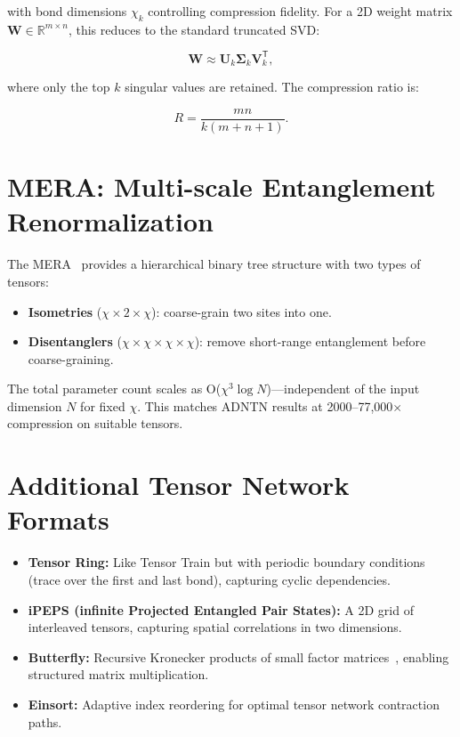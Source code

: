 \documentclass[11pt,a4paper,openright]{book}
\begin{document}
with bond dimensions $\chi_k$ controlling compression fidelity. For a 2D weight matrix $\mathbf{W} \in \mathbb{R}^{m \times n}$, this reduces to the standard truncated SVD:

\begin{equation}
	\label{eq:truncated_svd}
	\mathbf{W} \approx \mathbf{U}_k \boldsymbol{\Sigma}_k \mathbf{V}_k^\mathsf{T},
\end{equation}

where only the top $k$ singular values are retained. The compression ratio is:

\begin{equation}
	\label{eq:svd_ratio}
	R = \frac{mn}{k(m + n + 1)}.
\end{equation}

\section{MERA: Multi-scale Entanglement Renormalization}

The MERA~\cite{vidal2007entanglement} provides a hierarchical binary tree structure with two types of tensors:
\begin{itemize}
	\item \textbf{Isometries} ($\chi \times 2 \times \chi$): coarse-grain two sites into one.
	\item \textbf{Disentanglers} ($\chi \times \chi \times \chi \times \chi$): remove short-range entanglement before coarse-graining.
\end{itemize}

The total parameter count scales as O($\chi^3 \log N$)---independent of the input dimension $N$ for fixed $\chi$. This matches ADNTN results at 2000--77,000$\times$ compression on suitable tensors.

\section{Additional Tensor Network Formats}

\begin{itemize}
	\item \textbf{Tensor Ring:} Like Tensor Train but with periodic boundary conditions (trace over the first and last bond), capturing cyclic dependencies.
	\item \textbf{iPEPS (infinite Projected Entangled Pair States):} A 2D grid of interleaved tensors, capturing spatial correlations in two dimensions.
	\item \textbf{Butterfly:} Recursive Kronecker products of small factor matrices~\cite{dao2022monarch}, enabling structured matrix multiplication.
	\item \textbf{Einsort:} Adaptive index reordering for optimal tensor network contraction paths.
\end{itemize}
\end{document}
